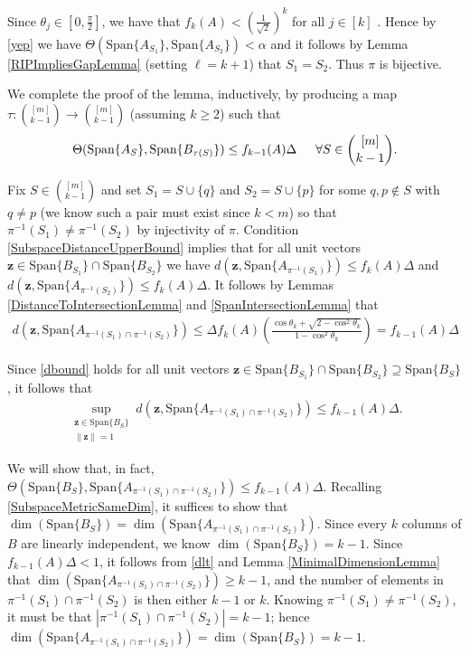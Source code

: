 \documentclass[journal,onecolumn]{IEEEtran}
\begin{document}
Since $\theta_j \in [0, \frac{\pi}{2}]$, we have that $f_k(A) < \left(\frac{1}{\sqrt{2}}\right)^k$ for all $j \in [k]$ . Hence by \eqref{yep} we have $\Theta(\text{Span}\{A_{S_1}\}, \text{Span}\{A_{S_2}\}) < \alpha$ and it follows by Lemma \ref{RIPImpliesGapLemma} (setting $\ell = k+1$) that $S_1 = S_2$. Thus $\pi$ is bijective. 

We complete the proof of the lemma, inductively, by producing a map $\tau: {[m] \choose k-1} \to {[m] \choose k-1}$ (assuming $k \geq 2$) such that
\begin{align}
\Theta(\text{Span}\{A_S\}, \text{Span}\{B_{\tau(S)}\}) \leq f_{k-1}(A) \Delta \indent \forall S \in {[m] \choose k-1}.
\end{align}

Fix $S \in {[m] \choose k-1}$ and set $S_1 = S \cup \{q\}$ and $S_2 = S \cup \{p\}$ for some $q,p \notin S$ with $q \neq p$ (we know such a pair must exist since $k < m$) so that $\pi^{-1}(S_1) \neq \pi^{-1}(S_2)$ by injectivity of $\pi$. Condition \eqref{SubspaceDistanceUpperBound} implies that for all unit vectors $\mathbf{z} \in \text{Span}\{B_{S_1}\} \cap \text{Span}\{B_{S_2}\}$ we have $d(\mathbf{z}, \text{Span}\{A_{\pi^{-1}(S_1)}\}) \leq f_k(A)\Delta$ and $d(\mathbf{z}, \text{Span}\{A_{\pi^{-1}(S_2)}\}) \leq f_k(A)\Delta$. It follows by Lemmas \ref{DistanceToIntersectionLemma} and \ref{SpanIntersectionLemma} that
\begin{align}\label{dbound}
d\left( \mathbf{z}, \text{Span}\{A_{\pi^{-1}(S_1) \cap \pi^{-1}(S_2)} \} \right)
\leq \Delta f_k(A) \left( \frac{ \cos\theta_k + \sqrt{2 - \cos^2\theta_k} }{1 - \cos^2\theta_k} \right)
= f_{k-1}(A)\Delta
\end{align}

Since \eqref{dbound} holds for all unit vectors $\mathbf{z} \in \text{Span}\{B_{S_1}\} \cap \text{Span}\{B_{S_2}\} \supseteq \text{Span}\{B_S\}$, it follows that
\begin{align}\label{dlt}
\sup_{ \substack{ \mathbf{z} \in \text{Span}\{B_{S} \}\\ \|\mathbf{z}\|=1} } d\left(\mathbf{z}, \text{Span}\{A_{\pi^{-1}(S_1) \cap \pi^{-1}(S_2)}\}  \right) \leq f_{k-1}(A)\Delta.
\end{align}

We will show that, in fact, $\Theta\left( \text{Span}\{B_S\}, \text{Span}\{A_{\pi^{-1}(S_1) \cap \pi^{-1}(S_2)}\} \right) \leq f_{k-1}(A)\Delta$. Recalling \eqref{SubspaceMetricSameDim}, it suffices to show that $\dim(\text{Span}\{B_{S}\}) = \dim( \text{Span}\{A_{\pi^{-1}(S_1) \cap \pi^{-1}(S_2)}\})$. Since every $k$ columns of $B$ are linearly independent, we know $\dim(\text{Span}\{B_{S}\}) = k-1$. Since $f_{k-1}(A)\Delta < 1$, it follows from \eqref{dlt} and Lemma \ref{MinimalDimensionLemma} that $\dim(\text{Span}\{A_{\pi^{-1}(S_1) \cap \pi^{-1}(S_2)}\}) \geq k-1$, and the number of elements in $\pi^{-1}(S_1) \cap \pi^{-1}(S_2)$ is then either $k-1$ or $k$. Knowing $\pi^{-1}(S_1) \neq \pi^{-1}(S_2)$, it must be that $|\pi^{-1}(S_1) \cap \pi^{-1}(S_2)| = k-1$; hence $\dim(\text{Span}\{A_{\pi^{-1}(S_1) \cap \pi^{-1}(S_2)}\}) = \dim(\text{Span}\{B_{S}\}) = k-1$. 
\end{document}
